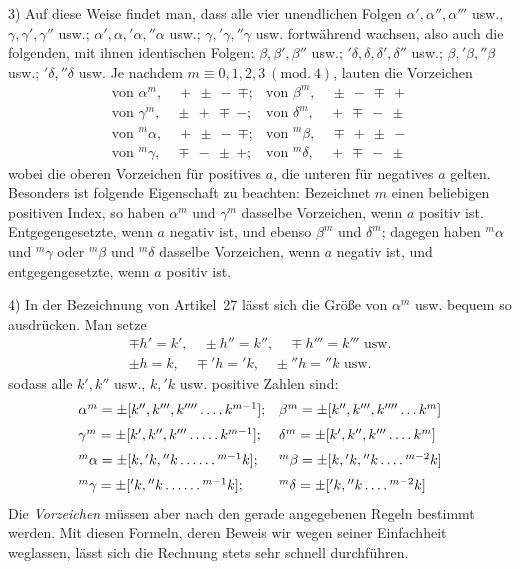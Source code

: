 3) Auf diese Weise findet man, dass alle vier unendlichen Folgen $\alpha',\alpha'',\alpha'''$ usw., $\gamma,\gamma',\gamma''$ usw.; $\alpha',\alpha,{}'\alpha,{}''\alpha$ usw.; $\gamma,{}'\gamma,{}''\gamma$ usw. fortwährend wachsen, also auch die folgenden, mit ihnen identischen Folgen: $\beta,\beta',\beta''$ usw.; ${}'\delta,\delta,\delta',\delta''$ usw.; $\beta,{}'\beta,{}''\beta$ usw.; ${}'\delta,{}''\delta$ usw. Je nachdem $m\equiv0,1,2,3\ (\mathrm{mod.}\ 4)$, lauten die Vorzeichen
\[
\begin{array}{ll}
\text{von }\alpha^m,\quad +\ \pm\ -\ \mp;&\text{von }\beta^m,\quad \pm\ -\ \mp\ +\\[6pt]
\text{von }\gamma^m,\quad \pm\ +\ \mp\ -;&\text{von }\delta^m,\quad +\ \mp\ -\ \pm\\[6pt]
\text{von }{}^m\alpha,\quad +\ \pm\ -\ \mp;&\text{von }{}^m\beta,\quad \mp\ +\ \pm\ -\\[6pt]
\text{von }{}^m\gamma,\quad \mp\ -\ \pm\ +;&\text{von }{}^m\delta,\quad +\ \mp\ -\ \pm
\end{array}
\]
wobei die oberen Vorzeichen für positives $a$, die unteren für negatives $a$ gelten. Besonders ist folgende Eigenschaft zu beachten: Bezeichnet $m$ einen beliebigen positiven Index, so haben $\alpha^m$ und $\gamma^m$ dasselbe Vorzeichen, wenn $a$ positiv ist. Entgegengesetzte, wenn $a$ negativ ist, und ebenso $\beta^m$ und $\delta^m$; dagegen haben ${}^m\alpha$ und ${}^m\gamma$ oder ${}^m\beta$ und ${}^m\delta$ dasselbe Vorzeichen, wenn $a$ negativ ist, und entgegengesetzte, wenn $a$ positiv ist.

4) In der Bezeichnung von Artikel~27 lässt sich die Größe von $\alpha^m$ usw. bequem so ausdrücken. Man setze
\[
\begin{gathered}
\mp h'=k',\quad \pm h''=k'',\quad \mp h'''=k'''\text{ usw.}\\
\pm h=k,\quad \mp{}'h={}'k,\quad \pm{}''h={}''k\text{ usw.}
\end{gathered}
\]
sodass alle $k',k''$ usw., $k,{}'k$ usw. positive Zahlen sind:
{\small
\setlength{\arraycolsep}{3pt}
\[
\begin{array}{ll}
\alpha^m=\pm[k'',k''',k''''\mathinner{\ldotp\ldotp\ldotp\ldotp} k^{m-1}];&\beta^m=\pm[k'',k''',k''''\mathinner{\ldotp\ldotp\ldotp} {k^m]}\\[6pt]
\gamma^m=\pm[k',k'',k'''\mathinner{\ldotp\ldotp\ldotp\ldotp\ldotp} k^{m-1}];&\delta^m=\pm[k',k'',k'''\mathinner{\ldotp\ldotp\ldotp\ldotp} k^m]\\[6pt]
{}^m\alpha=\pm[k,{}'k,{}''k\mathinner{\ldotp\ldotp\ldotp\ldotp\ldotp\ldotp}{}^{m-1}k];&{}^m\beta=\pm[k,{}'k,{}''k\mathinner{\ldotp\ldotp\ldotp\ldotp}{}^{m-2}k]\\[6pt]
{}^m\gamma=\pm[{}'k,{}''k\mathinner{\ldotp\ldotp\ldotp\ldotp\ldotp\ldotp}{}^{m-1}k];&{}^m\delta=\pm[{}'k,{}''k\mathinner{\ldotp\ldotp\ldotp\ldotp}{}^{m-2}k]
\end{array}
\]
}
Die \textit{Vorzeichen} müssen aber nach den gerade angegebenen Regeln bestimmt werden. Mit diesen Formeln, deren Beweis wir wegen seiner Einfachheit weglassen, lässt sich die Rechnung stets sehr schnell durchführen.

